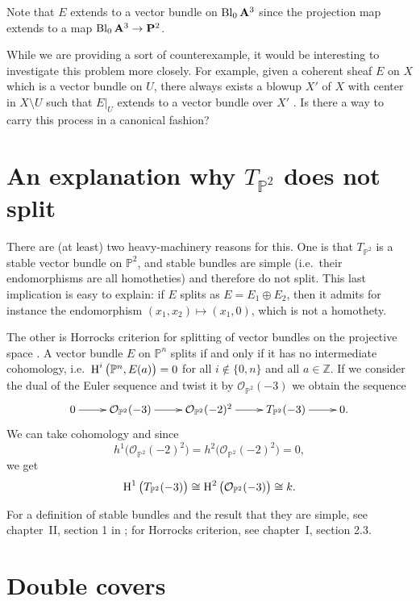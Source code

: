Note that $E$ extends to a vector bundle on $\operatorname{Bl}_{0} \mathbf{A}^3$ since the projection map extends to a map $\Bl_0 \Abb^3 \rarr \Pbb^2$.

\begin{remark}
  While we are providing a sort of counterexample, it would be interesting to investigate this problem more closely. For example, given a coherent sheaf $E$ on $X$ which is a vector bundle on $U$, there always exists a blowup $X'$ of $X$ with center in $X \setminus U$ such that $E|_U$ extends to a vector bundle over $X'$ \cite[Theorem 4.1]{Raynaud-Flat-modules}. Is there a way to carry this process in a canonical fashion?
\end{remark}


\section{An explanation why $T_{\mathbb{P}^2}$ does not split}

There are (at least) two heavy\--machinery reasons for this. One is that $T_{\mathbb{P}^2}$ is a stable vector bundle on $\mathbb{P}^2$, and stable bundles are simple (i.e.\ their endomorphisms are all homotheties) and therefore do not split. This last implication is easy to explain: if $E$ splits as ${E=E_1\oplus E_2}$, then it admits for instance the endomorphism ${(x_1,x_2)\mapsto(x_1,0)}$, which is not a homothety.

The other is Horrocks criterion for splitting of vector bundles on the projective space \cite{Horrocks-Punctured-spectrum}. A vector bundle $E$ on $\mathbb{P}^n$ splits if and only if it has no intermediate cohomology, i.e.\ ${\mathop{\textnormal{H}}\nolimits^i\big(\mathbb{P}^n,E(a)\big)=0}$ for all ${i\notin\{0,n\}}$ and all ${a\in\mathbb{Z}}$. If we consider the dual of the Euler sequence and twist it by ${\mathcal{O}_{\mathbb{P}^2}(-3)}$ we obtain the sequence
\[\xymatrix{0\ar[r] &\mathcal{O}_{\mathbb{P}^2}(-3)\ar[r] 
  &\mathcal{O}_{\mathbb{P}^2}(-2)^2\ar[r]
  &T_{\mathbb{P}^2}(-3)\ar[r] &0.}\]
We can take cohomology and since
\[
{h^1\big(\mathcal{O}_{\mathbb{P}^2}(-2)^2\big)=h^2\big(\mathcal{O}_{\mathbb{P}^2}(-2)^2\big)=0},
\]
we get
\[
{\mathop{\textnormal{H}}\nolimits^1\big(T_{\mathbb{P}^2}(-3)\big)\cong \mathop{\textnormal{H}}\nolimits^2\big(\mathcal{O}_{\mathbb{P}^2}(-3)\big)\cong k}.
\]

For a definition of stable bundles and the result that they are simple, see chapter~II, section 1 in \cite{OSS-Vector-bundles}; for Horrocks criterion, see chapter~I, section 2.3.  


\section{Double covers}

